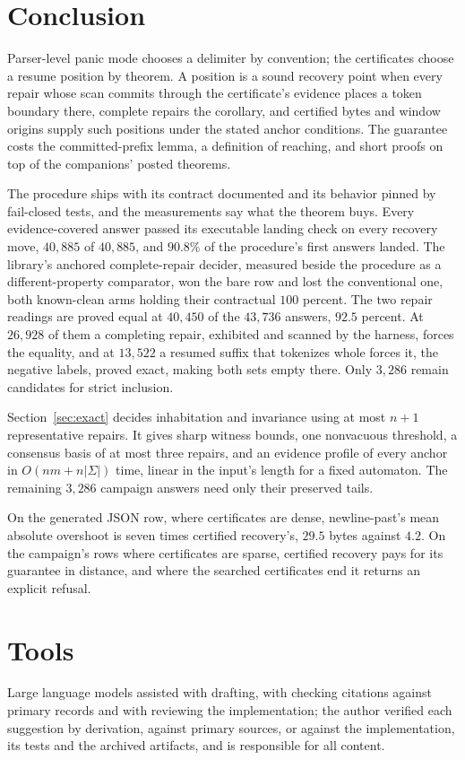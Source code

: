 \documentclass[11pt,a4paper]{article}
\theoremstyle{definition}
\theoremstyle{plain}
\theoremstyle{remark}
\begin{document}
\section{Conclusion}

Parser-level panic mode chooses a delimiter by convention; the certificates choose a resume position by theorem. A
position is a sound recovery point when every repair whose scan commits through the certificate's evidence places a
token boundary there, complete repairs the corollary, and certified bytes and window origins supply such positions under
the stated anchor conditions. The guarantee costs the committed-prefix lemma, a definition of reaching, and short proofs
on top of the companions' posted theorems.

The procedure ships with its contract documented and its behavior pinned by fail-closed tests, and the measurements say
what the theorem buys. Every evidence-covered answer passed its executable landing check on every recovery move,
$40{,}885$ of $40{,}885$, and $90.8$\% of the procedure's first answers landed. The library's anchored complete-repair
decider, measured beside the procedure as a different-property comparator, won the bare row and lost the conventional
one, both known-clean arms holding their contractual $100$ percent. The two repair readings are proved equal at
$40{,}450$ of the $43{,}736$ answers, $92.5$ percent. At $26{,}928$ of them a completing repair, exhibited and scanned
by the harness, forces the equality, and at $13{,}522$ a resumed suffix that tokenizes whole forces it, the negative
labels, proved exact, making both sets empty there. Only $3{,}286$ remain candidates for strict inclusion.

Section~\ref{sec:exact} decides inhabitation and invariance using at most $n + 1$ representative repairs. It gives sharp
witness bounds, one nonvacuous threshold, a consensus basis of at most three repairs, and an evidence profile of every
anchor in $O(nm + n|\Sigma|)$ time, linear in the input's length for a fixed automaton. The remaining $3{,}286$ campaign
answers need only their preserved tails.

On the generated JSON row, where certificates are dense, newline-past's mean absolute overshoot is seven times certified
recovery's, $29.5$ bytes against $4.2$. On the campaign's rows where certificates are sparse, certified recovery pays
for its guarantee in distance, and where the searched certificates end it returns an explicit refusal.

\section*{Tools}

Large language models assisted with drafting, with checking citations against primary records and with reviewing the
implementation; the author verified each suggestion by derivation, against primary sources, or against the
implementation, its tests and the archived artifacts, and is responsible for all content.

\begingroup \setlength{\bibsep}{2pt} 

\endgroup
\end{document}
